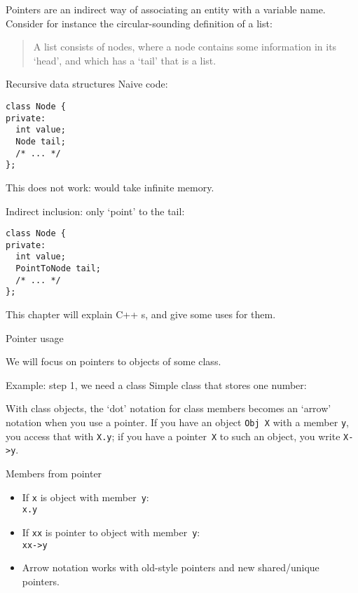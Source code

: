 

Pointers are an indirect way of associating an entity with a variable
name. Consider for instance the circular-sounding definition of a list:
\begin{quote}
  A list consists of nodes,
  where a node contains some information in its `head',
  and which has a `tail' that is a list.
\end{quote}

\begin{block}{Recursive data structures}
  \label{sl:recursive-node}
Naive code:
\begin{lstlisting}
class Node {
private:
  int value;
  Node tail;
  /* ... */
};
\end{lstlisting}
This does not work: would take infinite memory.

Indirect inclusion: only `point' to the tail:
\begin{lstlisting}
class Node {
private:
  int value;
  PointToNode tail;
  /* ... */
};
\end{lstlisting}
\end{block}

This chapter will explain C++ s, and give some uses for them.

 {Pointer usage}
\label{sec:shared_ptr}

We will focus on pointers to objects of some class.

\begin{block}{Example: step 1, we need a class}
  \label{sl:class-for-ptr}
  Simple class that stores one number:
\end{block}

With class objects, the `dot' notation for class members
becomes an `arrow' notation when you use a pointer.
If you have an
object \lstinline{Obj X} with a member \lstinline{y}, you access that with \lstinline{X.y}; if you
have a pointer~\lstinline{X} to such an object, you write \lstinline{X->y}.

\begin{block}{Members from pointer}
  \begin{itemize}
  \item If \lstinline{x} is object with member~\lstinline{y}:\\ \lstinline{x.y}
  \item If \lstinline{xx} is pointer to object with member~\lstinline{y}:\\ \lstinline{xx->y}
  \item Arrow notation works with old-style pointers and new
    shared/unique pointers.
  \end{itemize}
\end{block}


